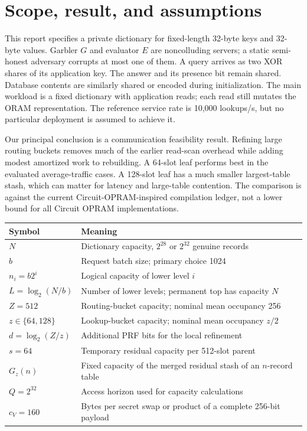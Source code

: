 \documentclass[11pt]{article}
\begin{document}
\section{Scope, result, and assumptions}
This report specifies a private dictionary for fixed-length 32-byte keys and
32-byte values. Garbler $G$ and evaluator $E$ are noncolluding servers; a
static semi-honest adversary corrupts at most one of them. A query arrives as
two XOR shares of its application key. The answer and its presence bit remain
shared. Database contents are similarly shared or encoded during initialization.
The main workload is a fixed dictionary with application reads; each read
still mutates the ORAM representation. The reference service rate is
10,000 lookups/s, but no particular deployment is assumed to achieve it.

Our principal conclusion is a communication feasibility result. Refining
large routing buckets removes much of the earlier read-scan overhead while
adding modest amortized work to rebuilding. A 64-slot leaf performs best
in the evaluated average-traffic cases. A 128-slot leaf has a much smaller
largest-table stash, which can matter for latency and large-table contention.
The comparison is against the current Circuit-OPRAM-inspired compilation
ledger, not a lower bound for all Circuit OPRAM implementations.

\begin{center}\small
\begin{tabularx}{\linewidth}{lX}\toprule
Symbol & Meaning\\\midrule
$N$ & Dictionary capacity, $2^{28}$ or $2^{32}$ genuine records\\
$b$ & Request batch size; primary choice 1024\\
$n_i=b2^i$ & Logical capacity of lower level $i$\\
$L=\log_2(N/b)$ & Number of lower levels; permanent top has capacity $N$\\
$Z=512$ & Routing-bucket capacity; nominal mean occupancy 256\\
$z\in\{64,128\}$ & Lookup-bucket capacity; nominal mean occupancy $z/2$\\
$d=\log_2(Z/z)$ & Additional PRF bits for the local refinement\\
$s=64$ & Temporary residual capacity per 512-slot parent\\
$G_z(n)$ & Fixed capacity of the merged residual stash of an $n$-record table\\
$Q=2^{32}$ & Access horizon used for capacity calculations\\
$c_V=160$ & Bytes per secret swap or product of a complete 256-bit payload\\
\bottomrule\end{tabularx}
\end{center}
\end{document}
